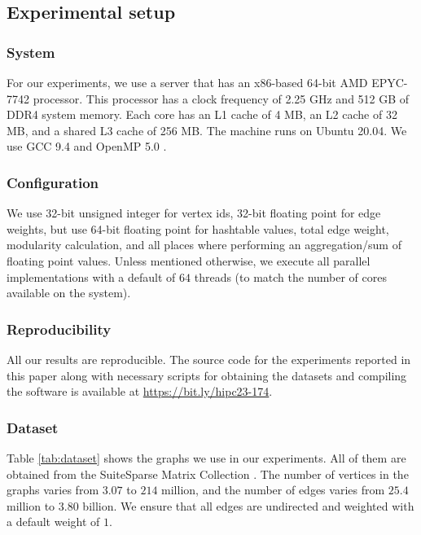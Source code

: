 \subsection{Experimental setup}
\label{sec:setup}

\subsubsection{System}
\label{sec:system}

For our experiments, we use a server that has an x86-based 64-bit AMD EPYC-7742 processor. This processor has a clock frequency of 2.25 GHz and 512 GB of DDR4 system memory. Each core has an L1 cache of 4 MB, an L2 cache of 32 MB, and a shared L3 cache of 256 MB. The machine runs on Ubuntu 20.04. We use GCC 9.4 and OpenMP 5.0 \cite{openmp18}.


\subsubsection{Configuration}
\label{sec:configuration}

We use 32-bit unsigned integer for vertex ids, 32-bit floating point for edge weights, but use 64-bit floating point for hashtable values, total edge weight, modularity calculation, and all places where performing an aggregation/sum of floating point values. Unless mentioned otherwise, we execute all parallel implementations with a default of $64$ threads (to match the number of cores available on the system).




\subsubsection{Reproducibility}
\label{sec:reproducibilty}

All our results are reproducible. The source code for the experiments reported in this paper along with necessary scripts for obtaining the datasets and compiling the software is available at \url{https://bit.ly/hipc23-174}. 


\subsubsection{Dataset}
\label{sec:dataset}

Table \ref{tab:dataset} shows the graphs we use in our experiments. All of them are obtained from the SuiteSparse Matrix Collection \cite{suite19}. The number of vertices in the graphs varies from $3.07$ to $214$ million, and the number of edges varies from $25.4$ million to $3.80$ billion. We ensure that all edges are undirected and weighted with a default weight of $1$.


